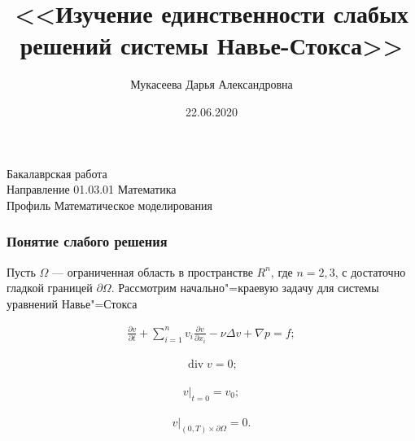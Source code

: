 \documentclass[10pt, pdf, hyperref={unicode}]{beamer}
\title{<<Изучение единственности слабых решений системы Навье-Стокса>>}
\date{22.06.2020}
\author{Мукасеева Дарья Александровна}
\begin{document}
    \begin{frame} %
        \titlepage
        \begin{center}
            Бакалаврская работа\\
            Направление 01.03.01 Математика\\
            Профиль Математическое моделирования
        \end{center}
    \end{frame}


    \begin{frame}
        \frametitle{Понятие слабого решения}
        \begin{center}
            \begin{minipage}[h]{0.97\linewidth}
Пусть $\Omega$ --- ограниченная область в пространстве $R^n$, где $n=2, 3$, с достаточно гладкой границей $\partial\Omega$.
Рассмотрим начально"=краевую задачу для системы уравнений Навье"=Стокса

\begin{equation}\label{eq:5.1}
    \begin{gathered}
        \frac{\partial v}{\partial t}+\sum_{i=1}^nv_i\frac{\partial v}{\partial x_i}-\nu\Delta v+\nabla p=f;
    \end{gathered}
\end{equation}

\begin{equation}\label{eq:5.2}
    \begin{gathered}
        \operatorname{div} v=0;
    \end{gathered}
\end{equation}

\begin{equation}\label{eq:5.3}
    \begin{gathered}
        v|_{t=0}=v_0;
    \end{gathered}
\end{equation}

\begin{equation}\label{eq:5.4}
    \begin{gathered}
        v|_{(0, T)\times\partial\Omega}=0.
    \end{gathered}
\end{equation}
            \end{minipage}
        \end{center}
    \end{frame}
\end{document}
